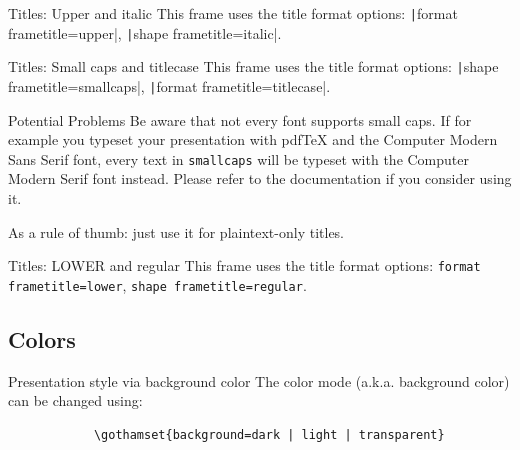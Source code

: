 \documentclass[aspectratio=169]{beamer}
\begin{document}
	{ 
	\begin{frame}{Titles: Upper and italic}
		This frame uses the title format options: \texttt|format frametitle=upper|, \texttt|shape frametitle=italic|.
	\end{frame}
	}

	{ 
	\begin{frame}{Titles: Small caps and titlecase}
		This frame uses the title format options: \texttt|shape frametitle=smallcaps|, \texttt|format frametitle=titlecase|.
		
		\begin{alertblock}{Potential Problems}
			Be aware that not every font supports small caps.
			If for example you typeset your presentation with pdfTeX and the Computer Modern Sans Serif font, every text in \texttt{smallcaps} will be typeset with the Computer Modern Serif font instead.
			Please refer to the documentation if you consider using it.
			
			As a rule of thumb: just use it for plaintext-only titles.
		\end{alertblock}
	\end{frame}
	}

	{ 
	\begin{frame}{Titles: LOWER and regular}
		This frame uses the title format options: \texttt{format frametitle=lower}, \texttt{shape frametitle=regular}.
	\end{frame}
	}


\subsection{Colors}

	{ 
	\begin{frame}[fragile]{Presentation style via background color}
		The color mode (a.k.a. background color) can be changed using:
		\begin{verbatim}
			\gothamset{background=dark | light | transparent}
		\end{verbatim}
	\end{frame}
	}
\end{document}
